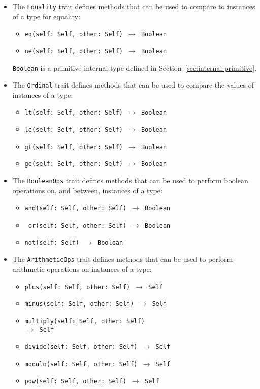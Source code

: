\documentclass[10pt,twocolumn,a4paper]{article}
\newcommand{\code}[1]{\texttt{#1}}
\begin{document}
\begin{itemize}
  \item The \code{Equality} trait defines methods that can be used to
    compare to instances of a type for equality:
    \begin{itemize}
      \item \texttt{eq(self: Self, other: Self) $\rightarrow$ Boolean}
      \item \texttt{ne(self: Self, other: Self) $\rightarrow$ Boolean}
    \end{itemize}
    \code{Boolean} is a primitive internal type defined in
    Section~\ref{sec:internal-primitive}.

  \item The \code{Ordinal} trait defines methods that can be used to
    compare the values of instances of a type:
    \begin{itemize}
      \item \texttt{lt(self: Self, other: Self) $\rightarrow$ Boolean}
      \item \texttt{le(self: Self, other: Self) $\rightarrow$ Boolean}
      \item \texttt{gt(self: Self, other: Self) $\rightarrow$ Boolean}
      \item \texttt{ge(self: Self, other: Self) $\rightarrow$ Boolean}
    \end{itemize}

  \item The \code{BooleanOps} trait defines methods that can be used to
    perform boolean operations on, and between, instances of a type:
    \begin{itemize}
      \item \texttt{and(self: Self, other: Self) $\rightarrow$ Boolean}
      \item \texttt{ or(self: Self, other: Self) $\rightarrow$ Boolean}
      \item \texttt{not(self: Self) $\rightarrow$ Boolean}
    \end{itemize}

  \item The \code{ArithmeticOps} trait defines methods that can be used to
    perform arithmetic operations on instances of a type:
    \begin{itemize}
      \item \texttt{plus(self: Self, other: Self) $\rightarrow$ Self}
      \item \texttt{minus(self: Self, other: Self) $\rightarrow$ Self}
      \item \texttt{multiply(self: Self, other: Self)\\\hspace*{0.5cm}$\rightarrow$ Self}
      \item \texttt{divide(self: Self, other: Self) $\rightarrow$ Self}
      \item \texttt{modulo(self: Self, other: Self) $\rightarrow$ Self}
      \item \texttt{pow(self: Self, other: Self) $\rightarrow$ Self}
    \end{itemize}


\end{itemize}
\end{document}
